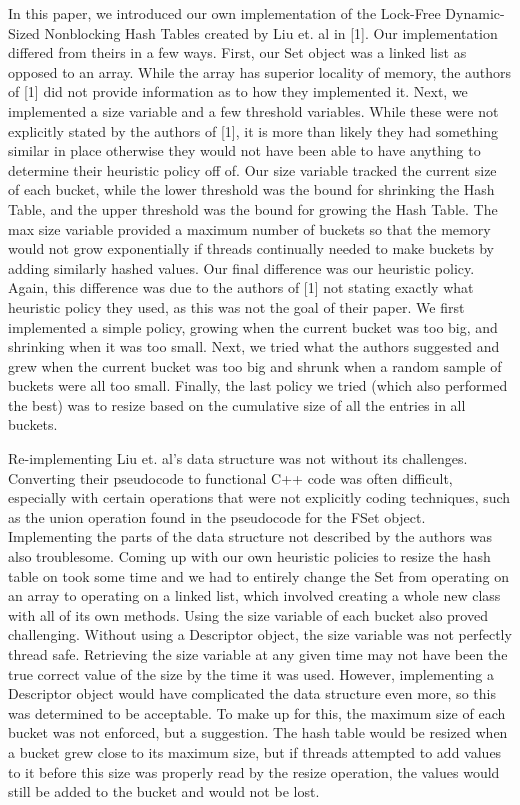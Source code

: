 \documentclass[11pt]{article} %
\begin{document}
In this paper, we introduced our own implementation of the Lock-Free Dynamic-Sized Nonblocking Hash Tables created by Liu et. al in [1]. Our implementation differed from theirs in a few ways. First, our Set object was a linked list as opposed to an array. While the array has superior locality of memory, the authors of [1] did not provide information as to how they implemented it. Next, we implemented a size variable and a few threshold variables. While these were not explicitly stated by the authors of [1], it is more than likely they had something similar in place otherwise they would not have been able to have anything to determine their heuristic policy off of. Our size variable tracked the current size of each bucket, while the lower threshold was the bound for shrinking the Hash Table, and the upper threshold was the bound for growing the Hash Table. The max size variable provided a maximum number of buckets so that the memory would not grow exponentially if threads continually needed to make buckets by adding similarly hashed values. Our final difference was our heuristic policy. Again, this difference was due to the authors of [1] not stating exactly what heuristic policy they used, as this was not the goal of their paper. We first implemented a simple policy, growing when the current bucket was too big, and shrinking when it was too small. Next, we tried what the authors suggested and grew when the current bucket was too big and shrunk when a random sample of buckets were all too small. Finally, the last policy we tried (which also performed the best) was to resize based on the cumulative size of all the entries in all buckets. 

Re-implementing Liu et. al's data structure was not without its challenges. Converting their pseudocode to functional C++ code was often difficult, especially with certain operations that were not explicitly coding techniques, such as the union operation found in the pseudocode for the FSet object. Implementing the parts of the data structure not described by the authors was also troublesome. Coming up with our own heuristic policies to resize the hash table on took some time and we had to entirely change the Set from operating on an array to operating on a linked list, which involved creating a whole new class with all of its own methods. Using the size variable of each bucket also proved challenging. Without using a Descriptor object, the size variable was not perfectly thread safe. Retrieving the size variable at any given time may not have been the true correct value of the size by the time it was used. However, implementing a Descriptor object would have complicated the data structure even more, so this was determined to be acceptable. To make up for this, the maximum size of each bucket was not enforced, but a suggestion. The hash table would be resized when a bucket grew close to its maximum size, but if threads attempted to add values to it before this size was properly read by the resize operation, the values would still be added to the bucket and would not be lost. 
\end{document}
